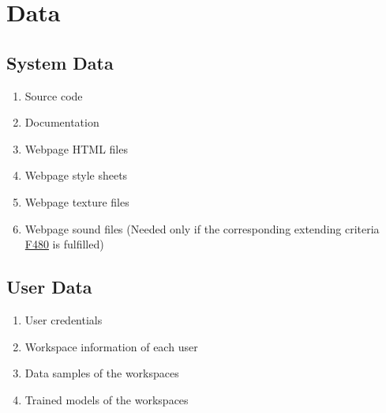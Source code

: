 \section{Data}
\subsection{System Data}
\begin{enumerate}[{label = \textbf{/D{\protect\twodigits{\arabic{enumi}}}0/}, leftmargin = *}]
    \item Source code   %
    \item Documentation %
    \item Webpage HTML files
    \item Webpage style sheets
    \item Webpage texture files
    \item Webpage sound files (Needed only if the corresponding extending criteria \hyperref[/F480/]{F480} is fulfilled)
\end{enumerate}

\subsection{User Data}
\begin{enumerate}[resume*]
    \item User credentials
    \item Workspace information of each user
    \item Data samples of the workspaces
    \item Trained models of the workspaces
\end{enumerate}
